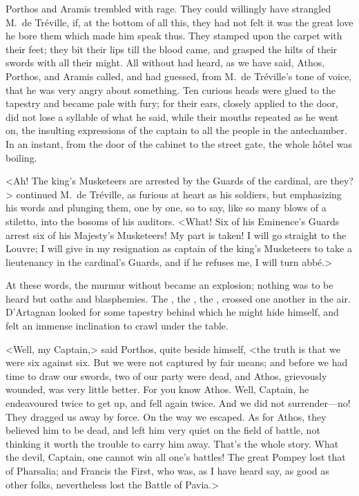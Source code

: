Porthos and Aramis trembled with rage. They could willingly have strangled M.~de Tréville, if, at the bottom of all this, they had not felt it was the great love he bore them which made him speak thus. They stamped upon the carpet with their feet; they bit their lips till the blood came, and grasped the hilts of their swords with all their might. All without had heard, as we have said, Athos, Porthos, and Aramis called, and had guessed, from M.~de Tréville's tone of voice, that he was very angry about something. Ten curious heads were glued to the tapestry and became pale with fury; for their ears, closely applied to the door, did not lose a syllable of what he said, while their mouths repeated as he went on, the insulting expressions of the captain to all the people in the antechamber. In an instant, from the door of the cabinet to the street gate, the whole hôtel was boiling. 

<Ah! The king's Musketeers are arrested by the Guards of the cardinal, are they?> continued M.~de Tréville, as furious at heart as his soldiers, but emphasizing his words and plunging them, one by one, so to say, like so many blows of a stiletto, into the bosoms of his auditors. <What! Six of his Eminence's Guards arrest six of his Majesty's Musketeers!  My part is taken! I will go straight to the Louvre; I will give in my resignation as captain of the king's Musketeers to take a lieutenancy in the cardinal's Guards, and if he refuses me,  I will turn abbé.> 

At these words, the murmur without became an explosion; nothing was to be heard but oaths and blasphemies. The , the , the , crossed one another in the air. D'Artagnan looked for some tapestry behind which he might hide himself, and felt an immense inclination to crawl under the table. 

<Well, my Captain,> said Porthos, quite beside himself, <the truth is that we were six against six. But we were not captured by fair means; and before we had time to draw our swords, two of our party were dead, and Athos, grievously wounded, was very little better. For you know Athos. Well, Captain, he endeavoured twice to get up, and fell again twice. And we did not surrender—no! They dragged us away by force. On the way we escaped. As for Athos, they believed him to be dead, and left him very quiet on the field of battle, not thinking it worth the trouble to carry him away. That's the whole story. What the devil, Captain, one cannot win all one's battles! The great Pompey lost that of Pharsalia; and Francis the First, who was, as I have heard say, as good as other folks, nevertheless lost the Battle of Pavia.> 

